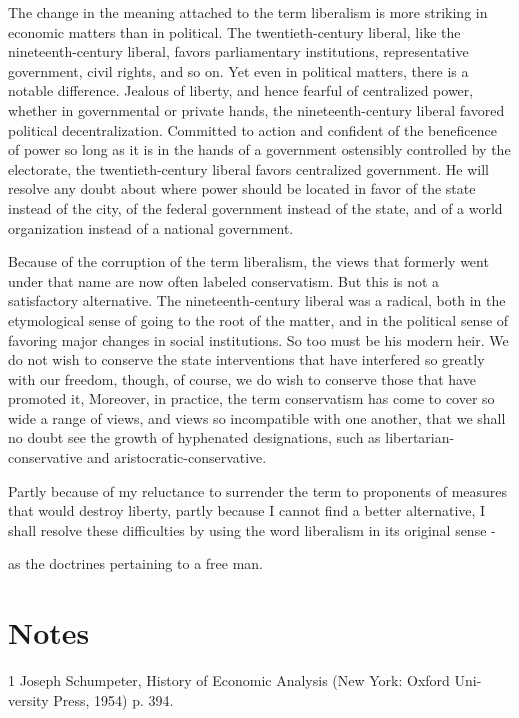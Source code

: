 \documentclass[11pt,openany]{book}
\newcommand{\booknoteshead}{%
  \phantomsection\section*{Notes}%
  \addcontentsline{toc}{section}{Notes}\markright{Notes}}
\begin{document}
The change in the meaning attached to the term liberalism is more striking in economic matters than in political. The twentieth-century liberal, like the nineteenth-century liberal, favors parliamentary institutions, representative government, civil rights, and so on. Yet even in political matters, there is a notable difference. Jealous of liberty, and hence fearful of centralized power, whether in governmental or private hands, the nineteenth-century liberal favored political decentralization. Committed to action and confident of the beneficence of power so long as it is in the hands of a government ostensibly controlled by the electorate, the twentieth-century liberal favors centralized government. He will resolve any doubt about where power should be located in favor of the state instead of the city, of the federal government instead of the state, and of a world organization instead of a national government.

Because of the corruption of the term liberalism, the views that formerly went under that name are now often labeled conservatism. But this is not a satisfactory alternative. The nineteenth-century liberal was a radical, both in the etymological sense of going to the root of the matter, and in the political sense of favoring major changes in social institutions. So too must be his modern heir. We do not wish to conserve the state interventions that have interfered so greatly with our freedom, though, of course, we do wish to conserve those that have promoted it, Moreover, in practice, the term conservatism has come to cover so wide a range of views, and views so incompatible with one another, that we shall no doubt see the growth of hyphenated designations, such as libertarian-conservative and aristocratic-conservative.

Partly because of my reluctance to surrender the term to proponents of measures that would destroy liberty, partly because I cannot find a better alternative, I shall resolve these difficulties by using the word liberalism in its original sense -

as the doctrines pertaining to a free man.

\booknoteshead

{\footnotesize\setlength{\parindent}{0pt}\setlength{\parskip}{5pt}

1 Joseph Schumpeter, History of Economic Analysis (New York: Oxford Uni- versity Press, 1954) p. 394.\par

}
\end{document}
